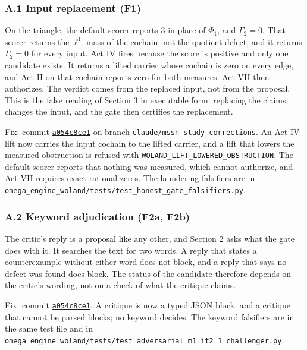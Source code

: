 \documentclass[
  11pt,
]{article}
\newcommand{\passthrough}[1]{#1}
\begin{document}
\subsubsection{A.1 Input replacement
(F1)}\label{a.1-input-replacement-f1}

On the triangle, the default scorer reports 3 in place of \(\Phi_1\),
and \(\Gamma_2 = 0\). That scorer returns the \(\ell^1\) mass of the
cochain, not the quotient defect, and it returns \(\Gamma_2 = 0\) for
every input. Act IV fires because the score is positive and only one
candidate exists. It returns a lifted carrier whose cochain is zero on
every edge, and Act II on that cochain reports zero for both measures.
Act VII then authorizes. The verdict comes from the replaced input, not
from the proposal. This is the false reading of Section 3 in executable
form: replacing the claims changes the input, and the gate then
certifies the replacement.

Fix: commit
\href{https://github.com/dbccpage/the_symbol_game/commit/a054c8ce17c3025ac5518aaeef29096a299519bb}{\passthrough{\lstinline!a054c8ce1!}}
on branch \nolinkurl{claude/mssn-study-corrections}. An Act IV lift now
carries the input cochain to the lifted carrier, and a lift that lowers
the measured obstruction is refused with
\nolinkurl{WOLAND_LIFT_LOWERED_OBSTRUCTION}. The default scorer reports
that nothing was measured, which cannot authorize, and Act VII requires
exact rational zeros. The laundering falsifiers are in
\nolinkurl{omega_engine_woland/tests/test_honest_gate_falsifiers.py}.

\subsubsection{A.2 Keyword adjudication (F2a,
F2b)}\label{a.2-keyword-adjudication-f2a-f2b}

The critic's reply is a proposal like any other, and Section 2 asks what
the gate does with it. It searches the text for two words. A reply that
states a counterexample without either word does not block, and a reply
that says no defect was found does block. The status of the candidate
therefore depends on the critic's wording, not on a check of what the
critique claims.

Fix: commit
\href{https://github.com/dbccpage/the_symbol_game/commit/a054c8ce17c3025ac5518aaeef29096a299519bb}{\passthrough{\lstinline!a054c8ce1!}}.
A critique is now a typed JSON block, and a critique that cannot be
parsed blocks; no keyword decides. The keyword falsifiers are in the
same test file and in
\nolinkurl{omega_engine_woland/tests/test_adversarial_m1_it2_1_challenger.py}.
\end{document}
